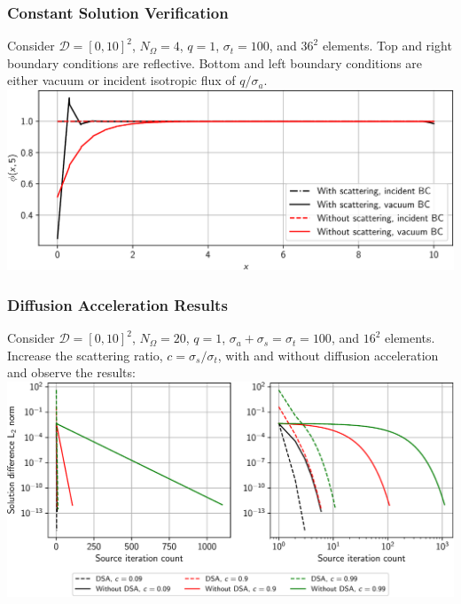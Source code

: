 \documentclass[xcolor={usenames,dvipsnames,svgnames,table}, 10pt]{beamer}
\newcommand{\spatial}{\mathcal{D}} %
\begin{document}

\begin{frame}\frametitle{Constant Solution Verification}
	Consider $\spatial = [0, 10]^2$, $N_\Omega = 4$, $q = 1$, $\sigma_t = 100$, and $36^2$ elements. Top and right boundary conditions are reflective. Bottom and left boundary conditions are either vacuum or incident isotropic flux of $q / \sigma_a$.
	\vfill
	\includegraphics[width=0.95\linewidth]{plots/constant_solution}
	\vfill
\end{frame}


\begin{frame}\frametitle{Diffusion Acceleration Results}
	Consider $\spatial = [0, 10]^2$, $N_\Omega = 20$, $q = 1$, $\sigma_a + \sigma_s = \sigma_t = 100$, and $16^2$ elements. Increase the scattering ratio, $c = \sigma_s / \sigma_t$, with and without diffusion acceleration and observe the results:
	\vfill
	\includegraphics[width=0.95\linewidth]{plots/dsa_residuals}
	\vfill
\end{frame}

\end{document}
